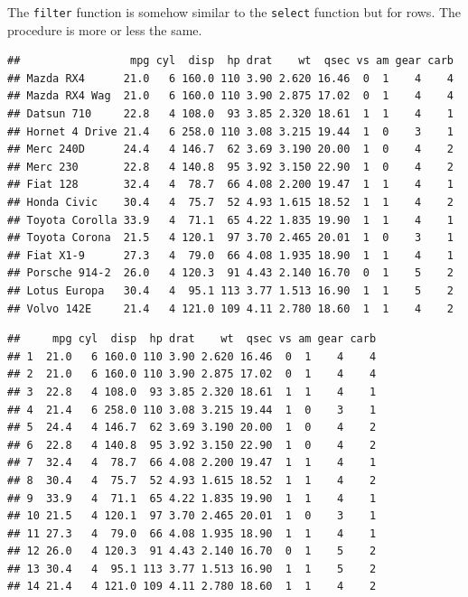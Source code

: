 \documentclass[]{report}
\newenvironment{Shaded}{\begin{snugshade}}{\end{snugshade}}
\newcommand{\KeywordTok}[1]{\textcolor[rgb]{0.13,0.29,0.53}{\textbf{#1}}}
\newcommand{\DecValTok}[1]{\textcolor[rgb]{0.00,0.00,0.81}{#1}}
\newcommand{\StringTok}[1]{\textcolor[rgb]{0.31,0.60,0.02}{#1}}
\newcommand{\CommentTok}[1]{\textcolor[rgb]{0.56,0.35,0.01}{\textit{#1}}}
\newcommand{\OperatorTok}[1]{\textcolor[rgb]{0.81,0.36,0.00}{\textbf{#1}}}
\newcommand{\NormalTok}[1]{#1}
\begin{document}
The \texttt{filter} function is somehow similar to the \texttt{select}
function but for rows. The procedure is more or less the same.

\begin{Shaded}
\end{Shaded}

\begin{verbatim}
##                 mpg cyl  disp  hp drat    wt  qsec vs am gear carb
## Mazda RX4      21.0   6 160.0 110 3.90 2.620 16.46  0  1    4    4
## Mazda RX4 Wag  21.0   6 160.0 110 3.90 2.875 17.02  0  1    4    4
## Datsun 710     22.8   4 108.0  93 3.85 2.320 18.61  1  1    4    1
## Hornet 4 Drive 21.4   6 258.0 110 3.08 3.215 19.44  1  0    3    1
## Merc 240D      24.4   4 146.7  62 3.69 3.190 20.00  1  0    4    2
## Merc 230       22.8   4 140.8  95 3.92 3.150 22.90  1  0    4    2
## Fiat 128       32.4   4  78.7  66 4.08 2.200 19.47  1  1    4    1
## Honda Civic    30.4   4  75.7  52 4.93 1.615 18.52  1  1    4    2
## Toyota Corolla 33.9   4  71.1  65 4.22 1.835 19.90  1  1    4    1
## Toyota Corona  21.5   4 120.1  97 3.70 2.465 20.01  1  0    3    1
## Fiat X1-9      27.3   4  79.0  66 4.08 1.935 18.90  1  1    4    1
## Porsche 914-2  26.0   4 120.3  91 4.43 2.140 16.70  0  1    5    2
## Lotus Europa   30.4   4  95.1 113 3.77 1.513 16.90  1  1    5    2
## Volvo 142E     21.4   4 121.0 109 4.11 2.780 18.60  1  1    4    2
\end{verbatim}

\begin{Shaded}
\end{Shaded}

\begin{verbatim}
##     mpg cyl  disp  hp drat    wt  qsec vs am gear carb
## 1  21.0   6 160.0 110 3.90 2.620 16.46  0  1    4    4
## 2  21.0   6 160.0 110 3.90 2.875 17.02  0  1    4    4
## 3  22.8   4 108.0  93 3.85 2.320 18.61  1  1    4    1
## 4  21.4   6 258.0 110 3.08 3.215 19.44  1  0    3    1
## 5  24.4   4 146.7  62 3.69 3.190 20.00  1  0    4    2
## 6  22.8   4 140.8  95 3.92 3.150 22.90  1  0    4    2
## 7  32.4   4  78.7  66 4.08 2.200 19.47  1  1    4    1
## 8  30.4   4  75.7  52 4.93 1.615 18.52  1  1    4    2
## 9  33.9   4  71.1  65 4.22 1.835 19.90  1  1    4    1
## 10 21.5   4 120.1  97 3.70 2.465 20.01  1  0    3    1
## 11 27.3   4  79.0  66 4.08 1.935 18.90  1  1    4    1
## 12 26.0   4 120.3  91 4.43 2.140 16.70  0  1    5    2
## 13 30.4   4  95.1 113 3.77 1.513 16.90  1  1    5    2
## 14 21.4   4 121.0 109 4.11 2.780 18.60  1  1    4    2
\end{verbatim}
\end{document}
